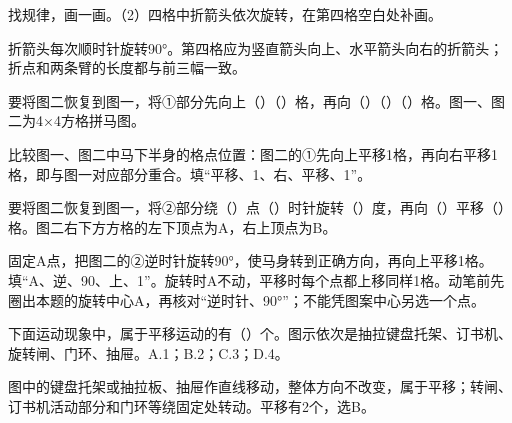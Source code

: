 找规律，画一画。（2）四格中折箭头依次旋转，在第四格空白处补画。\par
{}
\begin{BookAnswer}
折箭头每次顺时针旋转90°。第四格应为竖直箭头向上、水平箭头向右的折箭头；折点和两条臂的长度都与前三幅一致。
\end{BookAnswer}

要将图二恢复到图一，将①部分先向上（\hspace{1.8em}）（\hspace{1.8em}）格，再向（\hspace{1.8em}）（\hspace{1.8em}）（\hspace{1.8em}）格。图一、图二为4×4方格拼马图。\par
{}
\begin{BookAnswer}
比较图一、图二中马下半身的格点位置：图二的①先向上平移1格，再向右平移1格，即与图一对应部分重合。填“平移、1、右、平移、1”。
\end{BookAnswer}

要将图二恢复到图一，将②部分绕（\hspace{1.8em}）点（\hspace{1.8em}）时针旋转（\hspace{1.8em}）度，再向（\hspace{1.8em}）平移（\hspace{1.8em}）格。图二右下方方格的左下顶点为A，右上顶点为B。\par
{}
\begin{BookAnswer}
固定A点，把图二的②逆时针旋转90°，使马身转到正确方向，再向上平移1格。填“A、逆、90、上、1”。旋转时A不动，平移时每个点都上移同样1格。动笔前先圈出本题的旋转中心A，再核对“逆时针、90°”；不能凭图案中心另选一个点。
\end{BookAnswer}

下面运动现象中，属于平移运动的有（\hspace{1.8em}）个。图示依次是抽拉键盘托架、订书机、旋转闸、门环、抽屉。A.1；B.2；C.3；D.4。\par
{}
\begin{BookAnswer}
图中的键盘托架或抽拉板、抽屉作直线移动，整体方向不改变，属于平移；转闸、订书机活动部分和门环等绕固定处转动。平移有2个，选B。
\end{BookAnswer}

